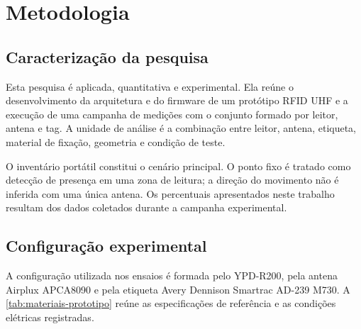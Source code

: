 %
%

\chapter{Metodologia}
\label{cap:metodologia}

\section{Caracterização da pesquisa}

Esta pesquisa é aplicada, quantitativa e experimental. Ela reúne o desenvolvimento da arquitetura e do firmware de um protótipo RFID UHF e a execução de uma campanha de medições com o conjunto formado por leitor, antena e tag. A unidade de análise é a combinação entre leitor, antena, etiqueta, material de fixação, geometria e condição de teste.

O inventário portátil constitui o cenário principal. O ponto fixo é tratado como detecção de presença em uma zona de leitura; a direção do movimento não é inferida com uma única antena. Os percentuais apresentados neste trabalho resultam dos dados coletados durante a campanha experimental.

\section{Configuração experimental}
\label{sec:configuracao-experimental}

A configuração utilizada nos ensaios é formada pelo YPD-R200, pela antena Airplux APCA8090 e pela etiqueta Avery Dennison Smartrac AD-239 M730. A \autoref{tab:materiais-prototipo} reúne as especificações de referência e as condições elétricas registradas.

